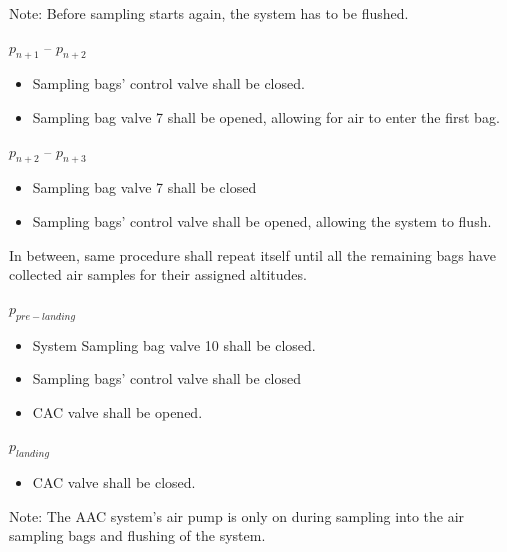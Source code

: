 Note: Before sampling starts again, the system has to be flushed. 

$p_{n+1}$ – $p_{n+2}$
\begin{itemize}
    \item Sampling bags' control valve shall be closed.
    \item Sampling bag valve 7 shall be opened, allowing for air to enter the first bag.
\end{itemize}

$p_{n+2}$ – $p_{n+3}$
\begin{itemize}
    \item Sampling bag valve 7 shall be closed
    \item Sampling bags' control valve shall be opened, allowing the system to flush. 
\end{itemize}

In between, same procedure shall repeat itself until all the remaining bags have collected air samples for their assigned altitudes.

$p_{pre-landing}$ 
\begin{itemize}
    \item System Sampling bag valve 10 shall be closed.
    \item Sampling bags' control valve shall be closed
    \item CAC valve shall be opened.
\end{itemize}


$p_{landing}$
\begin{itemize}
    \item CAC valve shall be closed.
\end{itemize}


Note: The AAC system's air pump is only on during sampling into the air sampling bags and flushing of the system.


\raggedbottom